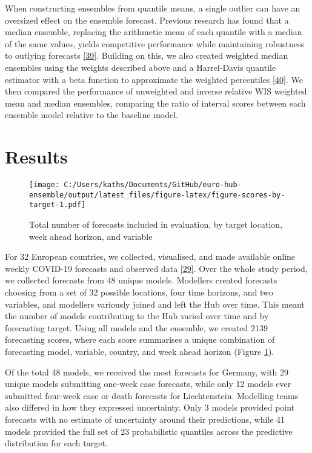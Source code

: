 \documentclass[
]{article}
\begin{document}
When constructing ensembles from quantile means, a single outlier can have an oversized effect on the ensemble forecast. Previous research has found that a median ensemble, replacing the arithmetic mean of each quantile with a median of the same values, yields competitive performance while maintaining robustness to outlying forecasts \protect\hyperlink{ref-rayComparingTrainedUntrained2022}{{[}39{]}}. Building on this, we also created weighted median ensembles using the weights described above and a Harrel-Davis quantile estimator with a beta function to approximate the weighted percentiles \protect\hyperlink{ref-harrellNewDistributionfreeQuantile1982}{{[}40{]}}. We then compared the performance of unweighted and inverse relative WIS weighted mean and median ensembles, comparing the ratio of interval scores between each ensemble model relative to the baseline model.

\hypertarget{results}{%
\section{Results}\label{results}}

\begin{figure}
\centering
\texttt{[image: C:/Users/kaths/Documents/GitHub/euro-hub-ensemble/output/latest\_files/figure-latex/figure-scores-by-target-1.pdf]}
\caption{\label{fig:figure-scores-by-target}Total number of forecasts included in evaluation, by target location, week ahead horizon, and variable}
\end{figure}

For 32 European countries, we collected, visualised, and made available online weekly COVID-19 forecasts and observed data \protect\hyperlink{ref-katharine_sherratt_2022_7356267}{{[}29{]}}. Over the whole study period, we collected forecasts from 48 unique models. Modellers created forecasts choosing from a set of 32 possible locations, four time horizons, and two variables, and modellers variously joined and left the Hub over time. This meant the number of models contributing to the Hub varied over time and by forecasting target. Using all models and the ensemble, we created 2139 forecasting scores, where each score summarises a unique combination of forecasting model, variable, country, and week ahead horizon (Figure \ref{fig:figure-scores-by-target}).

Of the total 48 models, we received the most forecasts for Germany, with 29 unique models submitting one-week case forecasts, while only 12 models ever submitted four-week case or death forecasts for Liechtenstein. Modelling teams also differed in how they expressed uncertainty. Only 3 models provided point forecasts with no estimate of uncertainty around their predictions, while 41 models provided the full set of 23 probabilistic quantiles across the predictive distribution for each target.
\end{document}
